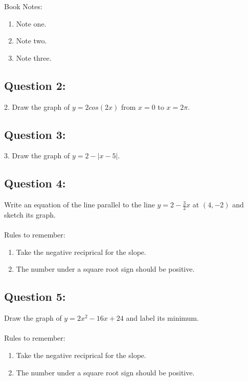 \documentclass[12pt, letterpaper]{article}
\begin{document}
Book Notes:
\begin{enumerate}
  \item Note one.
  \item Note two.
  \item Note three.
\end{enumerate}

\subsection{Question 2:}
2. Draw the graph of $y=2cos(2x)$ from $x=0$ to $x=2\pi$.

\newpage 
\subsection{Question 3:}
3. Draw the graph of $y=2-|x-5|$.


\subsection{Question 4:}
Write an equation of the line parallel to the line 
  $y=2-\frac{3}{2}x$ at $(4,-2)$ and sketch its graph.
  \\\\
  Rules to remember:
  \begin{enumerate}
    \item Take the negative reciprical for the slope.
    \item The number under a square root sign should be positive.
  \end{enumerate}

\subsection{Question 5:}
  Draw the graph of $y=2x^2-16x+24$ and label its minimum.
  \\\\
  Rules to remember:
  \begin{enumerate}
    \item Take the negative reciprical for the slope.
    \item The number under a square root sign should be positive.
  \end{enumerate}
\end{document}
